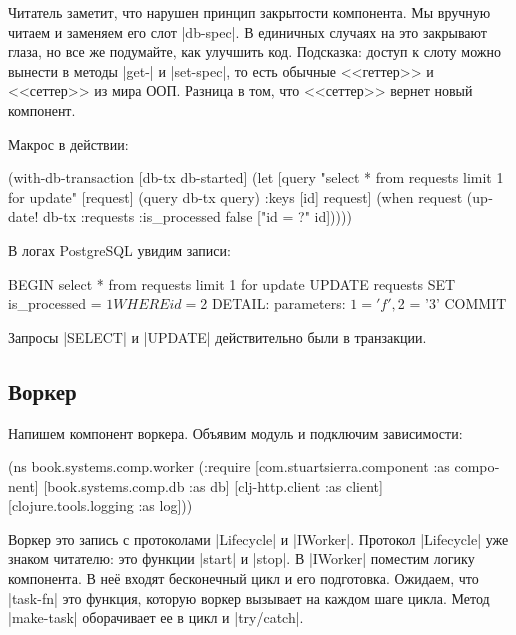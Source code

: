 Читатель заметит, что нарушен принцип закрытости компонента. Мы вручную читаем и
заменяем его слот \spverb|db-spec|. В единичных случаях на это закрывают глаза,
но все же подумайте, как улучшить код. Подсказка: доступ к слоту можно вынести в
методы \spverb|get-| и \spverb|set-spec|, то есть обычные <<геттер>> и
<<сеттер>> из мира ООП. Разница в том, что <<сеттер>> вернет новый компонент.

Макрос в действии:

\begin{english}
  \begin{clojure}
(with-db-transaction
  [db-tx db-started]
  (let [query "select * from requests limit 1 for update"
        [request] (query db-tx query)
        {:keys [id]} request]
    (when request
      (update! db-tx :requests
               {:is_processed false}
               ["id = ?" id]))))
  \end{clojure}
\end{english}

\noindent
В логах PostgreSQL увидим записи:

\begin{english}
  \begin{sql}
BEGIN
select * from requests limit 1 for update
UPDATE requests SET is_processed = $1 WHERE id = $2
DETAIL:  parameters: $1 = 'f', $2 = '3'
COMMIT
  \end{sql}
\end{english}

\noindent
Запросы \spverb|SELECT| и \spverb|UPDATE| действительно были в транзакции.

\subsection{Воркер}

Напишем компонент воркера. Объявим модуль и подключим зависимости:

\begin{english}
  \begin{clojure}
(ns book.systems.comp.worker
  (:require
   [com.stuartsierra.component :as component]
   [book.systems.comp.db :as db]
   [clj-http.client :as client]
   [clojure.tools.logging :as log]))
  \end{clojure}
\end{english}

Воркер это запись с протоколами \spverb|Lifecycle| и \spverb|IWorker|. Протокол
\spverb|Lifecycle| уже знаком читателю: это функции \spverb|start| и
\spverb|stop|. В \spverb|IWorker| поместим логику компонента. В не\"{е} входят
бесконечный цикл и его подготовка. Ожидаем, что \spverb|task-fn| это функция,
которую воркер вызывает на каждом шаге цикла. Метод \spverb|make-task|
оборачивает ее в цикл и \spverb|try/catch|.

